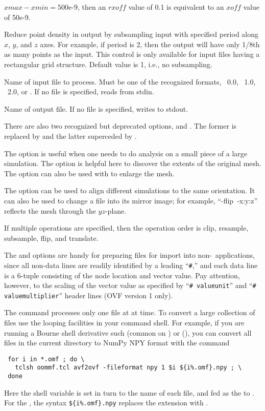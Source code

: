 \begin{description}
  $\mathit{xmax} - \mathit{xmin} = \mbox{500e-9}$, then an
  $\mathit{rxoff}$ value of 0.1 is equivalent
  to an $\mathit{xoff}$ value of 50e-9.
\item[\optkey{-subsample period}]
  Reduce point density in output by subsampling input with specified
  period along $x$, $y$, and $z$ axes.  For example, if period is 2,
  then the output will have only 1/8th as many points as the input.
  This control is only available for input files having a rectangular
  grid structure.  Default value is 1, i.e., no subsampling.
\item[\optkey{infile}]
  Name of input file to process.  Must be one of the recognized
  formats, \OVF\ 0.0, \OVF\ 1.0, \OVF\ 2.0, or \VIO.  If no file is
  specified, reads from stdin.
\item[\optkey{outfile}]
  Name of output file.  If no file is specified, writes to stdout.
\end{description}

There are also two recognized but deprecated options,
 and . The former is replaced by
 and the latter superceded by .

The  option is useful when one needs to do analysis on a
small piece of a large simulation.  The  option is helpful
here to discover the extents of the original mesh.  The 
option can also be used with  to enlarge the mesh.

The  option can be used to align different simulations
to the same orientation.  It can also be used to change a file into its
mirror image; for example, ``-flip~-x:y:z'' reflects the mesh through
the $yz$-plane.

If multiple operations are specified, then the operation order is
clip, resample, subsample, flip, and translate.

The  and  options are handy for
preparing files for import into non-\OOMMF\ applications, since all
non-data lines are readily identified by a leading ``\verb+#+,'' and
each data line is a 6-tuple consisting of the node location and vector
value.  Pay attention, however, to the scaling of the vector value as
specified by ``\verb+# valueunit+'' and ``\verb+# valuemultiplier+''
header lines (OVF version 1 only).

The  command processes only one file at at time. To convert
a large collection of files use the looping facilities in your command
shell. For example, if you are running a Bourne shell derivative such
 (common on \Linux) or  (\MacOSX), you can convert all
 files in the current directory to NumPy NPY format with the
command
\begin{verbatim}
 for i in *.omf ; do \
   tclsh oommf.tcl avf2ovf -fileformat npy 1 $i ${i%.omf}.npy ; \
 done
\end{verbatim}
Here the shell variable  is set in turn to the name of each
\cd{.omf} file, and fed as the \cd{infile} to \cd{avf2ovf}. For the
\cd{outfile}, the syntax
\verb+${i%.omf}.npy+ replaces the  extension with .

